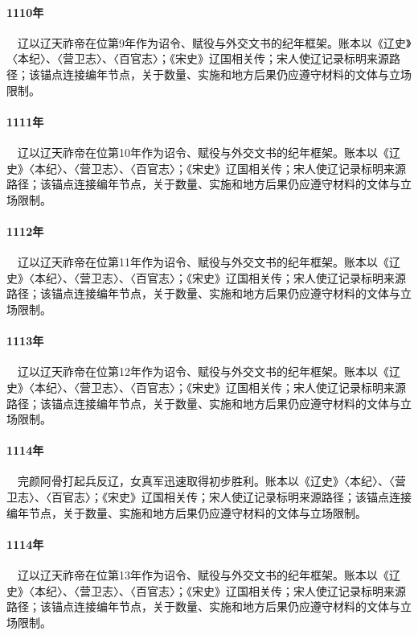 \paragraph{1110年}　辽以辽天祚帝在位第9年作为诏令、赋役与外交文书的纪年框架。账本以《辽史》〈本纪〉、〈营卫志〉、〈百官志〉；《宋史》辽国相关传；宋人使辽记录标明来源路径；该锚点连接编年节点，关于数量、实施和地方后果仍应遵守材料的文体与立场限制。

\paragraph{1111年}　辽以辽天祚帝在位第10年作为诏令、赋役与外交文书的纪年框架。账本以《辽史》〈本纪〉、〈营卫志〉、〈百官志〉；《宋史》辽国相关传；宋人使辽记录标明来源路径；该锚点连接编年节点，关于数量、实施和地方后果仍应遵守材料的文体与立场限制。

\paragraph{1112年}　辽以辽天祚帝在位第11年作为诏令、赋役与外交文书的纪年框架。账本以《辽史》〈本纪〉、〈营卫志〉、〈百官志〉；《宋史》辽国相关传；宋人使辽记录标明来源路径；该锚点连接编年节点，关于数量、实施和地方后果仍应遵守材料的文体与立场限制。

\paragraph{1113年}　辽以辽天祚帝在位第12年作为诏令、赋役与外交文书的纪年框架。账本以《辽史》〈本纪〉、〈营卫志〉、〈百官志〉；《宋史》辽国相关传；宋人使辽记录标明来源路径；该锚点连接编年节点，关于数量、实施和地方后果仍应遵守材料的文体与立场限制。

\paragraph{1114年}　完颜阿骨打起兵反辽，女真军迅速取得初步胜利。账本以《辽史》〈本纪〉、〈营卫志〉、〈百官志〉；《宋史》辽国相关传；宋人使辽记录标明来源路径；该锚点连接编年节点，关于数量、实施和地方后果仍应遵守材料的文体与立场限制。

\paragraph{1114年}　辽以辽天祚帝在位第13年作为诏令、赋役与外交文书的纪年框架。账本以《辽史》〈本纪〉、〈营卫志〉、〈百官志〉；《宋史》辽国相关传；宋人使辽记录标明来源路径；该锚点连接编年节点，关于数量、实施和地方后果仍应遵守材料的文体与立场限制。


